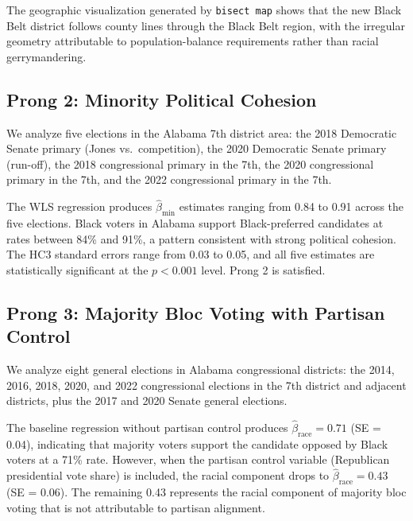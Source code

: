 The geographic visualization generated by \texttt{bisect map} shows that the
new Black Belt district follows county lines through the Black Belt region,
with the irregular geometry attributable to population-balance requirements
rather than racial gerrymandering.

\subsection{Prong 2: Minority Political Cohesion}

We analyze five elections in the Alabama 7th district area: the 2018 Democratic
Senate primary (Jones vs.\ competition), the 2020 Democratic Senate primary
(run-off), the 2018 congressional primary in the 7th, the 2020 congressional
primary in the 7th, and the 2022 congressional primary in the 7th.

The WLS regression produces $\hat{\beta}_{\text{min}}$ estimates ranging from
0.84 to 0.91 across the five elections.  Black voters in Alabama support
Black-preferred candidates at rates between 84\% and 91\%, a pattern
consistent with strong political cohesion.  The HC3 standard errors range
from 0.03 to 0.05, and all five estimates are statistically significant at
the $p < 0.001$ level.  Prong 2 is satisfied.

\subsection{Prong 3: Majority Bloc Voting with Partisan Control}

We analyze eight general elections in Alabama congressional districts: the
2014, 2016, 2018, 2020, and 2022 congressional elections in the 7th district
and adjacent districts, plus the 2017 and 2020 Senate general elections.

The baseline regression without partisan control produces $\hat{\beta}_{\text{race}}
= 0.71$ (SE = 0.04), indicating that majority voters support the candidate
opposed by Black voters at a 71\% rate.  However, when the partisan control
variable (Republican presidential vote share) is included, the racial component
drops to $\hat{\beta}_{\text{race}} = 0.43$ (SE = 0.06).  The remaining 0.43
represents the racial component of majority bloc voting that is not attributable
to partisan alignment.

